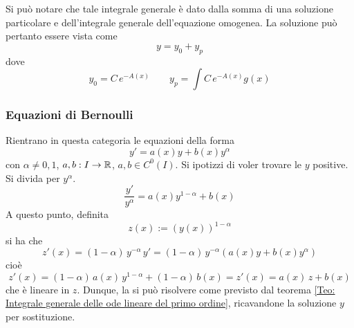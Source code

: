 Si può notare che tale integrale generale è dato dalla somma di una soluzione particolare e dell'integrale generale dell'equazione omogenea. La soluzione può pertanto essere vista come
\begin{equation}
    y=y_0+ y_p
\end{equation}
dove
\begin{equation}
    y_0= C\, e^{-A(x)} \qquad y_p= \int C\, e^{-A(x)}g(x)
\end{equation}
\subsubsection{Equazioni di Bernoulli}
Rientrano in questa categoria le equazioni della forma
\begin{equation} \label{Eq: Equazione di Bernoulli}
    y'=a(x)y+ b(x)y^{\alpha}
\end{equation}
con $\alpha \neq 0, 1$, $a, b: I \to \mathbb{R}$, $a,b \in C^0(I)$. Si ipotizzi di voler trovare le $y$ positive.
Si divida per $y^\alpha$.
\begin{equation}
    \frac{y'}{y^\alpha}=a(x)y^{1-\alpha}+ b(x)
\end{equation}
A questo punto, definita
\begin{equation}
    z(x):= \left(y(x)\right)^{1-\alpha}
\end{equation}
si ha che
\begin{equation}
    z'(x)=(1-\alpha)\, y^{-\alpha}\,y'=(1-\alpha)\,y^{-\alpha}\left( a(x)y+ b(x)y^{\alpha}\right)
\end{equation}
cioè
\begin{equation}
    z'(x)=(1-\alpha)\,a(x)\,y^{1-\alpha}+ (1-\alpha)\, b(x) = z'(x)=a(x)\,z+b(x)
\end{equation}
che è lineare in $z$. Dunque, la si può risolvere come previsto dal teorema \eqref{Teo: Integrale generale delle ode lineare del primo ordine}, ricavandone la soluzione $y$ per sostituzione.
